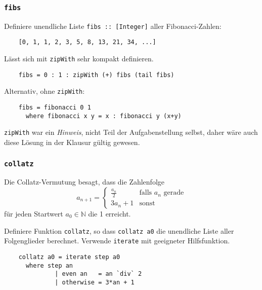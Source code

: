 \documentclass{beamer}
\date{2016-11-14/15}
\begin{document}
\normalsize
\normalem

\begin{frame}[plain]
  \titlepage
\end{frame}

\begin{frame}[fragile]
  \frametitle{\lstinline{fibs}}
  Definiere unendliche Liste \lstinline{fibs :: [Integer]} aller Fibonacci-Zahlen:
  \begin{lstlisting}
    [0, 1, 1, 2, 3, 5, 8, 13, 21, 34, ...]
  \end{lstlisting}
  Lässt sich mit \lstinline{zipWith} sehr kompakt definieren.
  \pause
  \begin{lstlisting}
    fibs = 0 : 1 : zipWith (+) fibs (tail fibs)
  \end{lstlisting}
  Alternativ, ohne \lstinline{zipWith}:
  \begin{lstlisting}
    fibs = fibonacci 0 1
      where fibonacci x y = x : fibonacci y (x+y)
  \end{lstlisting}
  \lstinline{zipWith} war ein \emph{Hinweis}, nicht Teil der Aufgabenstellung selbst, daher wäre auch diese Lösung in der Klausur gültig gewesen.
\end{frame}

\begin{frame}[fragile]
  \frametitle{\lstinline{collatz}}
  Die Collatz-Vermutung besagt, dass die Zahlenfolge
  \[a_{n+1} = \begin{cases}\frac{a_n}{2} & \text{falls $a_n$ gerade} \\ 3a_n + 1 & \text{sonst}\end{cases}\]
  für jeden Startwert $a_0 ∈ ℕ$ die 1 erreicht.
  
  Definiere Funktion \lstinline{collatz}, so dass \lstinline{collatz a0} die unendliche Liste aller Folgenglieder berechnet.
  Verwende \lstinline{iterate} mit geeigneter Hilfsfunktion.
  \pause
  \begin{lstlisting}
    collatz a0 = iterate step a0
      where step an
              | even an   = an `div` 2
              | otherwise = 3*an + 1
  \end{lstlisting}
\end{frame}
\end{document}
